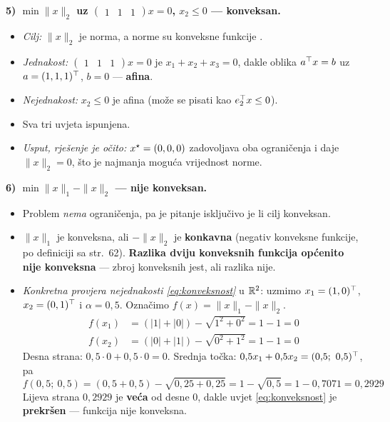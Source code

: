 \begin{zadatak}
\textbf{5) $\min \|x\|_2$ uz $\begin{pmatrix}1&1&1\end{pmatrix}x = 0$,
$x_2 \le 0$ --- konveksan.}
\begin{itemize}
  \item \emph{Cilj:} $\|x\|_2$ je norma, a norme su konveksne funkcije
        . \checkmark
  \item \emph{Jednakost:} $\begin{pmatrix}1&1&1\end{pmatrix}x = 0$ je
        $x_1 + x_2 + x_3 = 0$, dakle oblika $a^{\top} x = b$ uz $a = (1,1,1)^{\top}$,
        $b = 0$ --- \textbf{afina}. \checkmark
  \item \emph{Nejednakost:} $x_2 \le 0$ je afina (može se pisati kao
        $e_2^{\top} x \le 0$). \checkmark
  \item Sva tri uvjeta ispunjena.
  \item \emph{Usput, rješenje je očito:} $x^{\star} = (0,0,0)$ zadovoljava oba
        ograničenja i daje $\|x\|_2 = 0$, što je najmanja moguća vrijednost
        norme.
\end{itemize}

\textbf{6) $\min \|x\|_1 - \|x\|_2$ --- nije konveksan.}
\begin{itemize}
  \item Problem \emph{nema} ograničenja, pa je pitanje isključivo je li cilj
        konveksan.
  \item $\|x\|_1$ je konveksna, ali $-\|x\|_2$ je \textbf{konkavna} (negativ
        konveksne funkcije, po definiciji sa str.\ 62). \textbf{Razlika dviju
        konveksnih funkcija općenito nije konveksna} --- zbroj konveksnih jest,
        ali razlika nije.
  \item \emph{Konkretna provjera nejednakosti \eqref{eq:konveksnost}} u $\mathbb{R}^2$:
        uzmimo $x_1 = (1,0)^{\top}$, $x_2 = (0,1)^{\top}$ i $\alpha = 0{,}5$. Označimo
        $f(x) = \|x\|_1 - \|x\|_2$.
        \begin{align}
        f(x_1) &= (|1|+|0|) - \sqrt{1^2+0^2} = 1 - 1 = 0 \\
        f(x_2) &= (|0|+|1|) - \sqrt{0^2+1^2} = 1 - 1 = 0
        \end{align}
        Desna strana: $0{,}5\cdot 0 + 0{,}5\cdot 0 = 0$.
        Srednja točka: $0{,}5x_1 + 0{,}5x_2 = (0{,}5;\ 0{,}5)\T$, pa
        \[
        f(0{,}5;\ 0{,}5) = (0{,}5 + 0{,}5) - \sqrt{0{,}25 + 0{,}25}
        = 1 - \sqrt{0{,}5} = 1 - 0{,}7071 = 0{,}2929
        \]
        Lijeva strana $0{,}2929$ je \textbf{veća} od desne $0$, dakle uvjet
        \eqref{eq:konveksnost} je \textbf{prekršen} --- funkcija nije
        konveksna. \checkmark
\end{itemize}
\end{zadatak}

